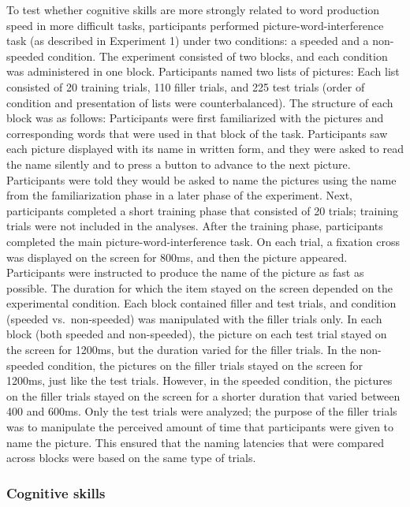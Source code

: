 \documentclass[
  man,floatsintext]{apa6}
\begin{document}
To test whether cognitive skills are more strongly related to word production speed in more difficult tasks, participants performed picture-word-interference task (as described in Experiment 1) under two conditions: a speeded and a non-speeded condition. The experiment consisted of two blocks, and each condition was administered in one block. Participants named two lists of pictures: Each list consisted of 20 training trials, 110 filler trials, and 225 test trials (order of condition and presentation of lists were counterbalanced). The structure of each block was as follows: Participants were first familiarized with the pictures and corresponding words that were used in that block of the task. Participants saw each picture displayed with its name in written form, and they were asked to read the name silently and to press a button to advance to the next picture. Participants were told they would be asked to name the pictures using the name from the familiarization phase in a later phase of the experiment. Next, participants completed a short training phase that consisted of 20 trials; training trials were not included in the analyses. After the training phase, participants completed the main picture-word-interference task. On each trial, a fixation cross was displayed on the screen for 800ms, and then the picture appeared. Participants were instructed to produce the name of the picture as fast as possible. The duration for which the item stayed on the screen depended on the experimental condition. Each block contained filler and test trials, and condition (speeded vs.~non-speeded) was manipulated with the filler trials only. In each block (both speeded and non-speeded), the picture on each test trial stayed on the screen for 1200ms, but the duration varied for the filler trials. In the non-speeded condition, the pictures on the filler trials stayed on the screen for 1200ms, just like the test trials. However, in the speeded condition, the pictures on the filler trials stayed on the screen for a shorter duration that varied between 400 and 600ms. Only the test trials were analyzed; the purpose of the filler trials was to manipulate the perceived amount of time that participants were given to name the picture. This ensured that the naming latencies that were compared across blocks were based on the same type of trials.

\hypertarget{cognitive-skills-1}{%
\subsubsection{Cognitive skills}\label{cognitive-skills-1}}
\end{document}
